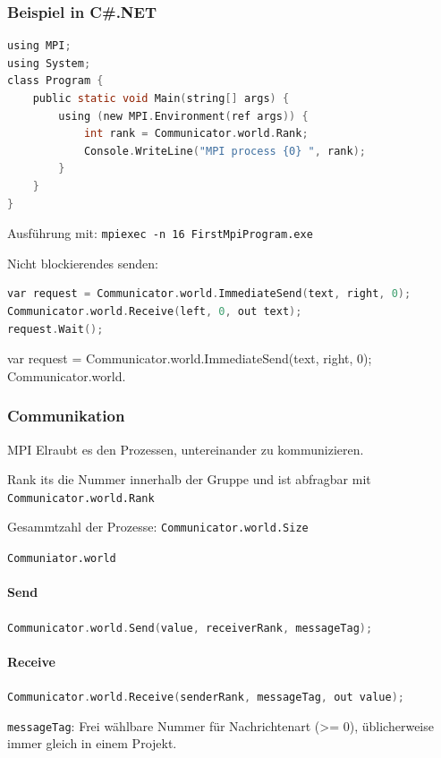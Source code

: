 \subsubsection{Beispiel in C\#.NET}

\begin{lstlisting}[language=C]
using MPI;
using System;
class Program {
	public static void Main(string[] args) {
		using (new MPI.Environment(ref args)) {
			int rank = Communicator.world.Rank;
			Console.WriteLine("MPI process {0} ", rank);
		}
	}
}
\end{lstlisting}

Ausführung mit: \lstinline|mpiexec -n 16 FirstMpiProgram.exe|

Nicht blockierendes senden:

\begin{lstlisting}[language=C]
var request = Communicator.world.ImmediateSend(text, right, 0);
Communicator.world.Receive(left, 0, out text);
request.Wait();
\end{lstlisting}

var request = Communicator.world.ImmediateSend(text, right, 0);
Communicator.world.

\subsubsection{Communikation}

MPI Elraubt es den Prozessen, untereinander zu kommunizieren.

Rank its die Nummer innerhalb der Gruppe und ist abfragbar mit \lstinline|Communicator.world.Rank|

Gesammtzahl der Prozesse: \lstinline|Communicator.world.Size|

\lstinline|Communiator.world|


\paragraph{Send}
\lstinline[language=C]|Communicator.world.Send(value, receiverRank, messageTag);|

\paragraph{Receive}
\lstinline[language=C]|Communicator.world.Receive(senderRank, messageTag, out value);|

\lstinline|messageTag|: Frei wählbare Nummer für Nachrichtenart (>= 0), üblicherweise immer gleich in einem Projekt. %


